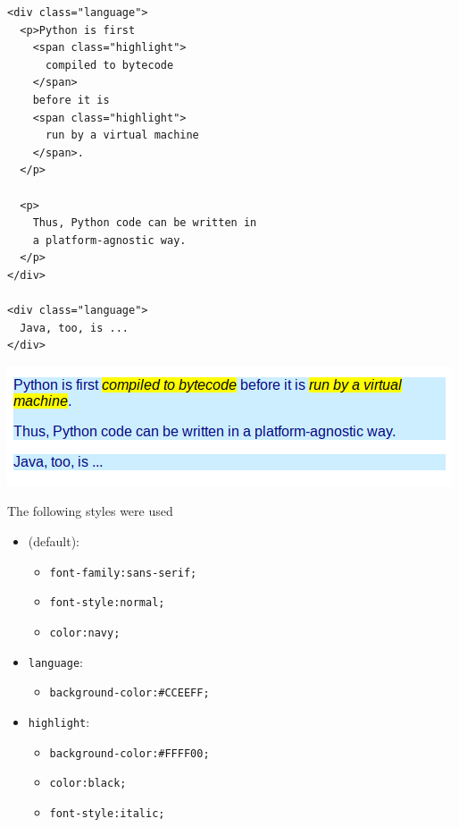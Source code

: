 \begin{frame}[fragile]
%
\begin{tcbraster}[raster columns=2,
                  raster equal height,
                  nobeforeafter,
                  raster column skip=0.1cm]
\begin{codebox}
\begin{verbatim}
<div class="language">
  <p>Python is first 
    <span class="highlight">
      compiled to bytecode
    </span>
    before it is
    <span class="highlight">
      run by a virtual machine
    </span>.
  </p>

  <p>
    Thus, Python code can be written in
    a platform-agnostic way.
  </p>
</div>

<div class="language">
  Java, too, is ...
</div>
\end{verbatim}
\end{codebox}
%
\begin{defbox}[Output]
\includegraphics[width=\linewidth]{./gfx/22-html-divpspan}

\scriptsize
The following styles were used
\begin{itemize}
\item (default): 
	\begin{itemize}
	\scriptsize
	\item \texttt{font-family:sans-serif;}
    \item \texttt{font-style:normal;}
    \item \texttt{color:navy;}
	\end{itemize}
\item \texttt{language}: 
	\begin{itemize}
	\scriptsize
	\item \texttt{background-color:\#CCEEFF;}
	\end{itemize}
\item \texttt{highlight}: 
	\begin{itemize}
	\scriptsize
	\item \texttt{background-color:\#FFFF00;}
    \item \texttt{color:black;}
    \item \texttt{font-style:italic;}
	\end{itemize}
\end{itemize}
\end{defbox}

\end{tcbraster}
%
\end{frame}

